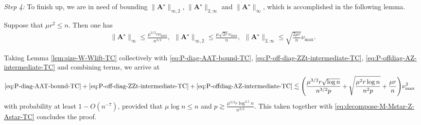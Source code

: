 \bigskip\noindent
{\em Step 4:}
To finish up,  we are in need of bounding $\|\bm{A}^{\star}\|_{\infty,2}$, $\|\bm{A}^{\star}\|_{2,\infty}$ and $\|\bm{A}^{\star}\|_{\infty}$, which is accomplished in the following lemma.
%
\begin{lemma}
	\label{lem:size-W-Wlift-TC}
	Suppose that $\mu r^{2}\leq n$. Then one has
\begin{align*}
	 \big\|\bm{A}^{\star}\big\|_{\infty} \leq\frac{\mu^{3/2}r\nu_{\max}}{n^{3/2}}  , ~~
	\big\|\bm{A}^{\star}\big\|_{\infty,2} \leq \frac{\mu \sqrt{2r}\nu_{\max}}{n} ,
	~~ \big\|\bm{A}^{\star}\big\|_{2,\infty}  \leq\sqrt{\frac{2\mu r}{n}}\nu_{\max} .
\end{align*}
%
\end{lemma}
%
Taking Lemma \ref{lem:size-W-Wlift-TC} collectively with \eqref{eq:P-diag-AAT-bound-TC}, \eqref{eq:P-off-diag-ZZt-intermediate-TC}, \eqref{eq:P-offdiag-AZ-intermediate-TC} and combining terms, we arrive at
%
\begin{align*}
\eqref{eq:P-diag-AAT-bound-TC} + \eqref{eq:P-off-diag-ZZt-intermediate-TC} + \eqref{eq:P-offdiag-AZ-intermediate-TC}
	& \lesssim\Bigg(
	\frac{\mu^{3/2}r\sqrt{\log n}}{n^{3/2}p} + \sqrt{\frac{\mu^{2}r\log n}{n^{2}p}}  + \frac{\mu r}{n} \Bigg)\nu_{\max}^{2}
\end{align*}
%
with probability at least $1-O(n^{-7})$,
provided that $\mu \log n \leq n$ and $p\gtrsim \frac{\mu^{3/2}r\log^{2.5}n}{n^{3/2}}$. This taken together with \eqref{eq:decompose-M-Mstar-Z-Astar-TC} concludes the proof.








